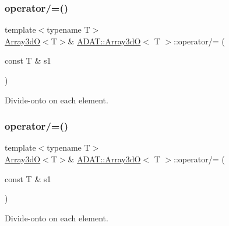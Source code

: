 \subsubsection{\texorpdfstring{operator/=()}{operator/=()}\hspace{0.1cm}{\footnotesize\ttfamily [4/6]}}
{\footnotesize\ttfamily template$<$typename T$>$ \\
\mbox{\hyperlink{classADAT_1_1Array3dO}{Array3dO}}$<$T$>$\& \mbox{\hyperlink{classADAT_1_1Array3dO}{A\+D\+A\+T\+::\+Array3dO}}$<$ T $>$\+::operator/= (\begin{DoxyParamCaption}\item[{const T \&}]{s1 }\end{DoxyParamCaption})\hspace{0.3cm}{\ttfamily [inline]}}



Divide-\/onto on each element. 

\mbox{\label{classADAT_1_1Array3dO_a9d82ba391c67603f43b112c945532de6}} 
\subsubsection{\texorpdfstring{operator/=()}{operator/=()}\hspace{0.1cm}{\footnotesize\ttfamily [5/6]}}
{\footnotesize\ttfamily template$<$typename T$>$ \\
\mbox{\hyperlink{classADAT_1_1Array3dO}{Array3dO}}$<$T$>$\& \mbox{\hyperlink{classADAT_1_1Array3dO}{A\+D\+A\+T\+::\+Array3dO}}$<$ T $>$\+::operator/= (\begin{DoxyParamCaption}\item[{const T \&}]{s1 }\end{DoxyParamCaption})\hspace{0.3cm}{\ttfamily [inline]}}



Divide-\/onto on each element. 

\mbox{\label{classADAT_1_1Array3dO_a9d82ba391c67603f43b112c945532de6}} 

